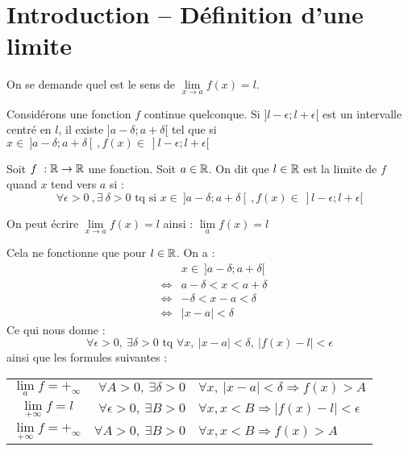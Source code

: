 \section*{Introduction -- Définition d'une limite}
On se demande quel est le sens de $\lim\limits_{x \to a} f(x) = l$.

Considérons une fonction $f$ continue quelconque. Si $]l-\epsilon; l+\epsilon[$ est un intervalle centré en $l$, il existe $]a-\delta;a+\delta[$ tel que si $x \in~ ]a-\delta;a+\delta[~, f(x) \in~ ] l-\epsilon; l+\epsilon[ $

Soit $f~: \mathbb{R} \to \mathbb{R}$ une fonction. Soit $a \in \mathbb{R}$. On dit que $l\in \mathbb{R}$ est la limite de $f$ quand $x$ tend vers $a$ si :
$$\forall \epsilon > 0~,\exists~ \delta >0 \text{~tq si~} x\in~]a-\delta;a+\delta[~, f(x) \in~]l-\epsilon; l+\epsilon[$$

\notation{}
 On peut écrire $\lim\limits_{x\to a}f(x)=l$ ainsi : $\lim\limits_{a}f(x)=l$ 

\remarque{}
Cela ne fonctionne que pour $l\in\mathbb{R}$.
\remarque{}
On a :
	\begin{eqnarray*}
		&&x\in~]a-\delta;a+\delta[~\\
		&\Leftrightarrow& a-\delta < x < a+\delta\\
		&\Leftrightarrow & -\delta < x-a < \delta\\
		&\Leftrightarrow & |x-a| < \delta
	\end{eqnarray*}
Ce qui nous donne :
$$\forall \epsilon > 0,~ \exists \delta > 0 \text{~tq~} \forall x,~ |x-a| <\delta,~ |f(x) - l| < \epsilon$$
ainsi que les formules suivantes :
\begin{center}
	\begin{tabular}{c!{si}r!{tq}l}
	$\lim\limits_{a}f = +_\infty$ & $\forall A >0,~\exists \delta > 0 $&$\forall x,~|x-a| < \delta \Rightarrow f(x) > A$\\
	$\lim\limits_{+\infty}f = l$ & $\forall \epsilon >0,~\exists B > 0 $&$\forall x,x < B \Rightarrow |f(x)-l| <\epsilon$\\
	$\lim\limits_{+\infty}f = +_\infty$ & $\forall A >0,~\exists B > 0 $&$\forall x,x < B \Rightarrow f(x) > A$
	\end{tabular}
\end{center}
